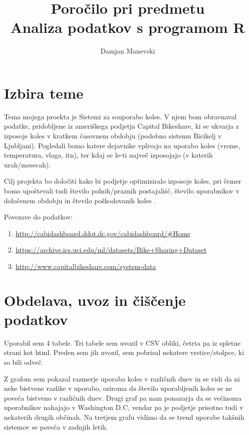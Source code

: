 \documentclass[11pt,a4paper]{article}
\begin{document}
\title{Poročilo pri predmetu \\
Analiza podatkov s programom R}
\author{Damjan Manevski}
\maketitle

\section{Izbira teme}

  Tema mojega proekta je  Sistemi za souporabo koles. V njem bom obravnaval podatke, pridobljene iz ameriškega podjetja Capital Bikeshare, ki se ukvarja z izposoje koles v kratkem časovnem obdobju (podobno sistemu Bicikelj v Ljubljani). Pogledali bomo katere dejavnike vplivajo na uporabo koles (vreme, temperatura, vlaga, itn), ter kdaj se le-ti največ izposojajo (v katerih urah/mesecah).
  
  Cilj projekta bo določiti kako bi podjetje optimiziralo izposoje koles, pri čemer bomo upoštevali tudi število polnih/praznih postajališč, število uporabnikov v določenem obdobju in število poškodovanih koles .
  
  Povezave do podatkov:
  
\begin{enumerate}

\item{\url{http://cabidashboard.ddot.dc.gov/cabidashboard/#Home}}

\item{\url{https://archive.ics.uci.edu/ml/datasets/Bike+Sharing+Dataset}}

\item{\url{http://www.capitalbikeshare.com/system-data}}

\end{enumerate}

\section{Obdelava, uvoz in čiščenje podatkov}

Uporabil sem 4 tabele. Tri tabele sem uvozil v CSV obliki, četrta pa iz spletne strani kot html. Preden sem jih uvozil, sem pobrisal nekatere vrstice/stolpce, ki so bili odveč.

Z grafom sem pokazal razmerje uporaba koles v različnih dnev in se vidi da ni neke bistvene razlike v uporabo, oziroma da število uporabljenih koles se ne poveča bistveno v različnih dnev. Drugi graf pa nam ponazarja da se večinoma uporabnikov nahajajo v Washington D.C, vendar pa je podjetje prisotno tudi v nekaterih drugih občinah. Na tretjem grafu vidimo da se trend uporabe takšnih sistemov se poveča v zadnjih letih.
\end{document}
